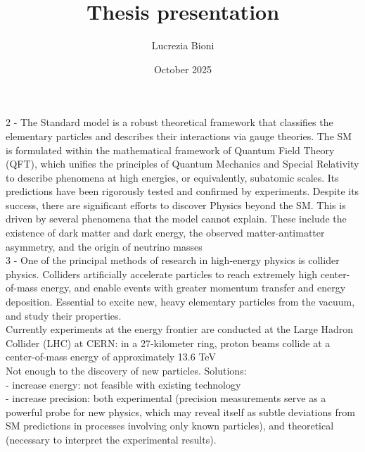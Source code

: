\documentclass{article}
\title{Thesis presentation}
\author{Lucrezia Bioni}
\date{October 2025}
\begin{document}
\maketitle

2 - The Standard model is a robust theoretical framework that classifies the elementary particles and describes their interactions via gauge theories. The SM is formulated within the mathematical framework of Quantum Field Theory (QFT), which unifies the principles of Quantum Mechanics and Special Relativity to describe phenomena at high energies, or equivalently, subatomic scales. Its predictions have been rigorously tested and confirmed by experiments.  Despite its success, there are significant efforts to discover Physics beyond the SM. This is driven by several phenomena that the model cannot explain. These include the existence of dark matter and dark energy, the observed matter-antimatter asymmetry, and the origin of neutrino masses \\

3 - One of the principal methods of research in high-energy physics is collider physics. Colliders artificially accelerate particles to reach extremely high center-of-mass energy, and  enable events with greater momentum transfer and energy deposition. Essential to excite new, heavy elementary particles from the vacuum, and study their properties. \\
Currently experiments at the energy frontier are conducted at the Large Hadron Collider (LHC) at CERN: in a 27-kilometer ring, proton beams collide at a center-of-mass energy of approximately 13.6 TeV \\
Not enough to the discovery of new particles. Solutions: \\
- increase energy: not feasible with existing technology \\
- increase precision: both experimental (precision measurements serve as a powerful probe for new physics, which may reveal itself as subtle deviations from SM predictions in processes involving only known particles), and theoretical (necessary to interpret the experimental results).  \\
\end{document}
